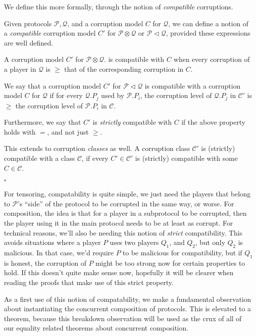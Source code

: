 We define this more formally, through the notion of \emph{compatible}
corruptions.

\begin{definition}
  \label{def:compatc}
  Given protocols $\mathscr{P}, \mathscr{Q}$, and a corruption model
  $C$ for $\mathscr{Q}$, we can define a notion of a \emph{compatible}
  corruption model $C'$ for $\mathscr{P} \otimes \mathscr{Q}$ or $\mathscr{P} \lhd \mathscr{Q}$,
  provided these expressions are well defined.

  A corruption model $C'$ for $\mathscr{P} \otimes \mathscr{Q}$.
  is compatible with $C$ when every corruption of a player
  in $\mathscr{Q}$ is $\geq$ that of the corresponding corruption in $C$.

  We say that a corruption model $C'$ for $\mathscr{P} \lhd \mathscr{Q}$ is compatible with
a corruption model $C$ for $\mathscr{Q}$ if for every
$\mathscr{Q}.P_j$ used by $\mathscr{P}.P_i$, the corruption
level of $\mathscr{Q}.P_j$ in $\mathscr{C}'$ is $\geq$ the corruption level of $\mathscr{P}.P_i$
in $\mathscr{C}$.

  Furthermore, we say that $C'$ is \emph{strictly} compatible
  with $C$ if the above property holds with $=$, and not just $\geq$.

  This extends to corruption \emph{classes} as well.
  A corruption class $\mathscr{C}'$ is (strictly) compatible with a class $\mathscr{C}$,
  if every $C' \in \mathscr{C}'$ is (strictly) compatible with some $C \in \mathscr{C}$.

  $\square$
\end{definition}

For tensoring, compatability is quite simple, we just need the players
that belong to $\mathscr{P}$'s ``side'' of the protocol
to be corrupted in the same way, or worse.
For composition, the idea is that for a player in a subprotocol
to be corrupted, then the player using it in the main protocol
needs to be at least as corrupt.
For technical reasons, we'll also be needing
this notion of \emph{strict} compatibility.
This avoids situations where a player $P$ uses two players $Q_1$,
and $Q_2$, but only $Q_2$ is malicious.
In that case, we'd require $P$ to be malicious for compatibility,
but if $Q_1$ is honest, the corruption of $P$
might be too strong now for certain properties to hold.
If this doesn't quite make sense now, hopefully it will
be clearer when reading the proofs that make use of this strict
property.

As a first use of this notion of compatability, we make
a fundamental observation about instantiating the concurrent composition
of protocols.
This is elevated to a theorem, because this breakdown observation
will be used as the crux of all of our equality related theorems about concurrent
composition.

